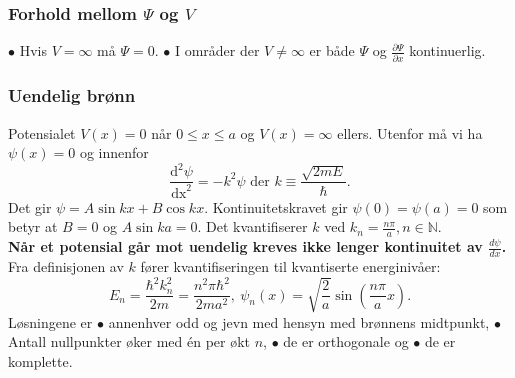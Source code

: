 \documentclass[a4paper, norsk, 8pt]{article}
\newcommand{\PAR}[2]{ \frac{\partial #1}{\partial #2}}
\begin{document}
\begin{multicols*}{3}
\subsubsection*{\scriptsize Forhold mellom $\Psi$ og $V$}
$\bullet$ Hvis $V=\infty$ må $\Psi=0$. $\bullet$ I områder der $V\neq \infty$ er både $\Psi$ og $\PAR{\Psi}{x}$ kontinuerlig.


\subsubsection*{\scriptsize Uendelig brønn}
Potensialet $V(x)=0$ når $0\leq x \leq a$ og $V(x)=\infty$ ellers. Utenfor må vi ha $\psi(x)=0$ og innenfor 
\[ \frac{\mbox{d}^2\psi}{\mbox{dx}^2}=-k^2\psi \mbox{ der } k\equiv \frac{\sqrt{2mE}}{\hbar}.  \]
Det gir $\psi=A\sin{kx}+B\cos{kx}$. Kontinuitetskravet gir $\psi(0)=\psi(a)=0$ som betyr at $B=0$ og $A\sin{ka}=0$. Det kvantifiserer $k$ ved $k_n=\frac{n\pi}{a},n\in\mathbb{N}$.\\
\textbf{Når et potensial går mot uendelig kreves ikke lenger kontinuitet av $\frac{d\psi}{dx}$.}\\
Fra definisjonen av $k$ fører kvantifiseringen til kvantiserte energinivåer:
\[ E_n=\frac{\hbar^2k_n^2}{2m}=\frac{n^2\pi\hbar^2}{2ma^2}, \ \psi_n(x)=\sqrt{\frac{2}{a}}\sin\left(\frac{n\pi}{a}x\right). \]
Løsningene er $\bullet$ annenhver odd og jevn med hensyn med brønnens midtpunkt, $\bullet$ Antall nullpunkter øker med én per økt $n$, $\bullet$ de er orthogonale og $\bullet$ de er komplette. 

 

\end{multicols*}
\end{document}
